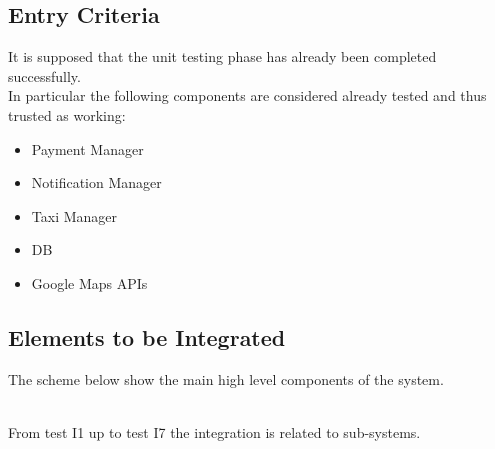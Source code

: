 \documentclass[a4paper,11pt]{report} %
\begin{document}
	\subsection{Entry Criteria}
		It is supposed that the unit testing phase has already been completed successfully.\\
		In particular the following components are considered already tested and thus trusted as working:
		\begin{itemize}
			\item Payment Manager
			\item Notification Manager
			\item Taxi Manager
			\item DB
			\item Google Maps APIs
		\end{itemize}
	\subsection{Elements to be Integrated}
		The scheme below show the main high level components of the system.\\
			\begin{minipage}{\linewidth}
			\end{minipage}
			\bigskip \\
			From test I1 up to test I7 the integration is related to sub-systems.\\
\end{document}
